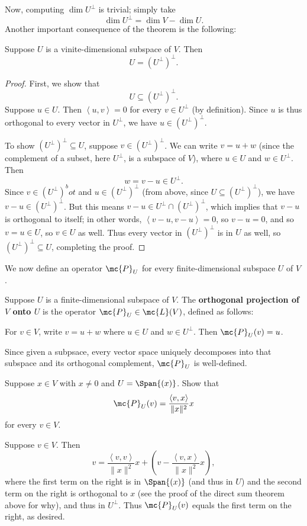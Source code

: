 \documentclass[math0540-lecture-notes.tex]{subfiles}
\begin{document}
Now, computing $\dim{U^{\bot}}$ is trivial; simply take \[
  \dim{U^{\bot}}=\dim{V}-\dim{U}
.\] Another important consequence of the theorem is the following:
\begin{proposition}{}
  Suppose $U$ is a vinite-dimensional subspace of $V$. Then \[
    U=\left( U^{\bot} \right) ^\bot
  .\] 
\end{proposition}
\begin{proof}[Proof]
  First, we show that \[
    U\subseteq \left( U^{\bot} \right) ^\bot
  .\] Suppose $u\in U$. Then $\left<u,v \right> =0$ for every $v\in U^{\bot}$ (by definition). Since
  $u$ is thus orthogonal to every vector in $U^{\bot}$, we have $u\in \left( U^{\bot} \right)
  ^\bot$.

  To show $\left( U^{\bot} \right) ^\bot\subseteq U$, suppose $v\in \left( U^{\bot} \right) ^\bot$.
  We can write $v=u+w$ (since the complement of a subset, here $U^{\bot}$, is a subspace of $V$),
  where $u\in U$ and $w\in U^{\bot}$. Then \[
    w=v-u\in U^{\bot}
  .\] Since $v\in \left( U^{\bot} \right) ^bot$ and $u\in \left( U^{\bot} \right)^\bot$ (from above,
  since $U\subseteq \left( U^{\bot} \right) ^\bot$), we have $v-u\in \left( U^{\bot} \right) ^\bot$.
  But this means $v-u\in U^{\bot}\cap \left( U^{\bot} \right) ^\bot$, which implies that $v-u$ is
  orthogonal to itself; in other words, $\left<v-u,v-u \right> =0$, so $v-u=0$, and so $v=u\in U$,
  so $v\in U$ as well. Thus every vector in $\left( U^{\bot} \right) ^\bot$ is in $U$ as well, so
  $\left( U^{\bot} \right) ^\bot\subseteq U$, completing the proof.
\end{proof}

We now define an operator $\mc{P}_U$ for every finite-dimensional subspace $U$ of $V$.

\begin{definition}{}
  Suppose $U$ is a finite-dimensional subspace of $V$. The \textbf{orthogonal projection of $V$ onto
  $U$} is the operator $\mc{P}_U\in \mc{L}(V)$, defined as follows: \begin{center}
    For $v\in V$, write $v=u+w$ where $u\in U$ and $w\in U^{\bot}$. Then $\mc{P}_U(v)=u$.
  \end{center}
\end{definition}

Since given a subpsace, every vector space uniquely decomposes into that subspace and its orthogonal
complement, $\mc{P}_U$ is well-defined.

\begin{example}
  Suppose $x\in V$ with $x\neq 0$ and $U=\Span{(x)}$. Show that \[
    \mc{P}_U(v)=\frac{\left<v,x \right> }{\|x\|^2}x
  \] for every $v\in V$.
\end{example}
\begin{solution}
  Suppose $v\in V$. Then \[
    v=\frac{\left<v,v \right> }{\|x\|^2}x+\left( v-\frac{\left<v,x \right> }{\|x\|^2}x \right) 
  ,\] where the first term on the right is in $\Span{(x)}$ (and thus in $U$) and the second term on
  the right is orthogonal to $x$ (see the proof of the direct sum theorem above for why), and thus
  in $U^{\bot}$. Thus $\mc{P}_U(v)$ equals the first term on the right, as desired.
\end{solution}
\end{document}
